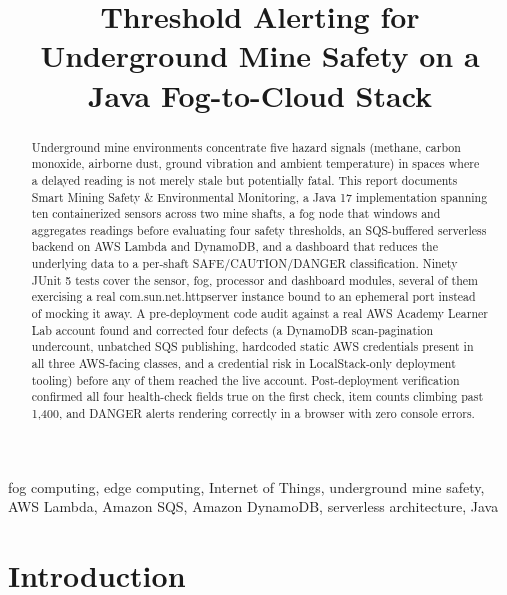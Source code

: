 \documentclass[conference]{IEEEtran}
\begin{document}
\title{Threshold Alerting for Underground Mine Safety on a Java Fog-to-Cloud Stack}

\author{
}

\maketitle

\begin{abstract}
Underground mine environments concentrate five hazard signals (methane, carbon monoxide, airborne dust, ground vibration and ambient temperature) in spaces where a delayed reading is not merely stale but potentially fatal. This report documents Smart Mining Safety \& Environmental Monitoring, a Java 17 implementation spanning ten containerized sensors across two mine shafts, a fog node that windows and aggregates readings before evaluating four safety thresholds, an SQS-buffered serverless backend on AWS Lambda and DynamoDB, and a dashboard that reduces the underlying data to a per-shaft SAFE/CAUTION/DANGER classification. Ninety JUnit 5 tests cover the sensor, fog, processor and dashboard modules, several of them exercising a real com.sun.net.httpserver instance bound to an ephemeral port instead of mocking it away. A pre-deployment code audit against a real AWS Academy Learner Lab account found and corrected four defects (a DynamoDB scan-pagination undercount, unbatched SQS publishing, hardcoded static AWS credentials present in all three AWS-facing classes, and a credential risk in LocalStack-only deployment tooling) before any of them reached the live account. Post-deployment verification confirmed all four health-check fields true on the first check, item counts climbing past 1,400, and DANGER alerts rendering correctly in a browser with zero console errors.
\end{abstract}

\begin{IEEEkeywords}
fog computing, edge computing, Internet of Things, underground mine safety, AWS Lambda, Amazon SQS, Amazon DynamoDB, serverless architecture, Java
\end{IEEEkeywords}

\section{Introduction}
\end{document}

